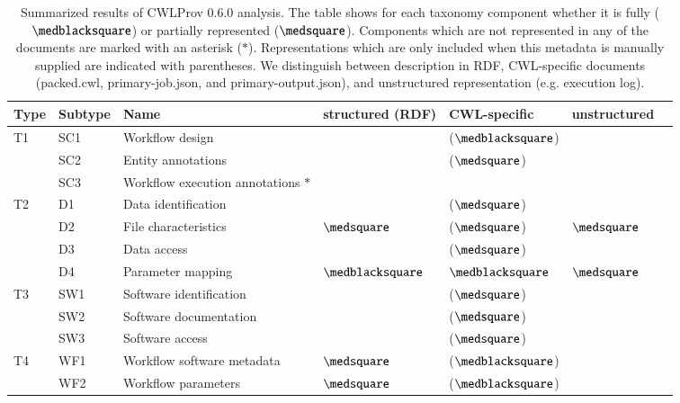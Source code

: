 \begin{table}[ht!]
\caption{Summarized results of CWLProv 0.6.0 analysis. The table shows for each taxonomy component whether it is fully ($\medblacksquare$) or partially represented ($\medsquare$). Components which are not represented in any of the documents are marked with an asterisk ($\ast$). Representations which are only included when this metadata is manually supplied are indicated with parentheses. We distinguish between description in RDF, CWL-specific documents (packed.cwl, primary-job.json, and primary-output.json), and unstructured representation (e.g. execution log).}
\label{tab:renske:analysis_res}

\begin{tabularx}{\linewidth}{l l L l l l l}
\toprule
{Type} & {Subtype} & {Name} & {structured (RDF)} & {CWL-specific} & {unstructured}  \\
\midrule
T1  & SC1   & Workflow design                   & ~    & ($\medblacksquare$) & ~  \\
    & SC2   & Entity annotations                & ~    & ($\medsquare$) & ~  \\
    & SC3   & Workflow execution annotations $\ast$   &      \\
\midrule
T2  & D1    & Data identification               & ~     & ($\medsquare$) & ~ \\
    & D2    & File characteristics              & $\medsquare$     &  ($\medsquare$)   & $\medsquare$ \\
    & D3    & Data access                       & ~ & ($\medsquare$) & ~ \\
    & D4    & Parameter mapping                 & $\medblacksquare$ & $\medblacksquare$ & $\medsquare$ \\
\midrule
T3  & SW1   & Software identification           & ~ & ($\medsquare$)  & ~  \\
    & SW2   & Software documentation            & ~ & ($\medsquare$)  & ~ \\
    & SW3   & Software access                   & ~ & ($\medsquare$)  & ~  \\
\midrule
T4  & WF1   & Workflow software metadata        & $\medsquare$ & ($\medblacksquare$)  & ~ \\
    & WF2   & Workflow parameters               & $\medsquare$ & ($\medblacksquare$)  & ~    \\

\end{tabularx}
\end{table}
